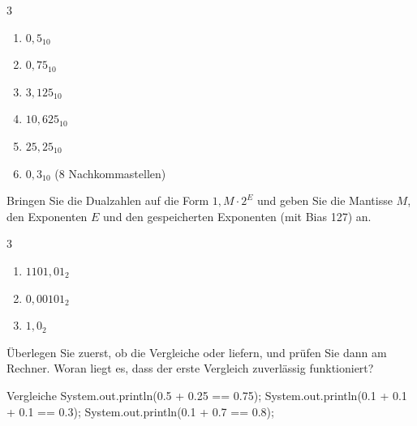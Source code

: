 \begin{multicols}{3}
\begin{enumerate}[label=\alph*)]
\item $0{,}5_{10}$
\item $0{,}75_{10}$
\item $3{,}125_{10}$
\item $10{,}625_{10}$
\item $25{,}25_{10}$
\item $0{,}3_{10}$ (8 Nachkommastellen)
\end{enumerate}
\end{multicols}

Bringen Sie die Dualzahlen auf die Form $1{,}M \cdot 2^E$ und geben Sie die Mantisse $M$, den Exponenten $E$ und den gespeicherten Exponenten (mit Bias 127) an.
\begin{multicols}{3}
\begin{enumerate}[label=\alph*)]
\item $1101{,}01_2$
\item $0{,}00101_2$
\item $1{,}0_2$
\end{enumerate}
\end{multicols}

Überlegen Sie zuerst, ob die Vergleiche  oder  liefern, und prüfen Sie dann am Rechner. Woran liegt es, dass der erste Vergleich zuverlässig funktioniert?
\begin{javacode}[Ausschnitt]{Vergleiche}
System.out.println(0.5 + 0.25 == 0.75);
System.out.println(0.1 + 0.1 + 0.1 == 0.3);
System.out.println(0.1 + 0.7 == 0.8);
\end{javacode}
